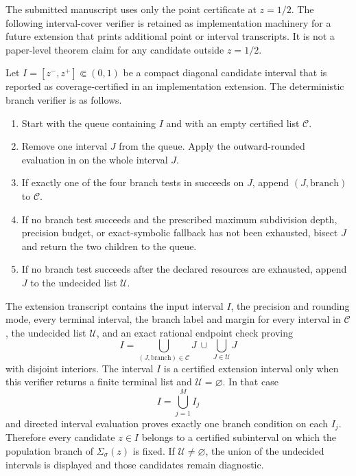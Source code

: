 The submitted manuscript uses only the point certificate at \(z=1/2\).  The
following interval-cover verifier is retained as implementation machinery for a
future extension that prints additional point or interval transcripts.  It is
not a paper-level theorem claim for any candidate outside \(z=1/2\).

\begin{algorithmiclemma}\label{lem:diagonal-certified-interval-cover-main}
Let \(I=[z^-,z^+]\Subset(0,1)\) be a compact diagonal candidate interval that
is reported as coverage-certified in an implementation extension.  The
deterministic branch verifier is as follows.

\begin{enumerate}[label=\textup{(\arabic*)},leftmargin=2.4em,itemsep=0.25em]
\item Start with the queue containing \(I\) and with an empty certified list
\(\mathcal C\).
\item Remove one interval \(J\) from the queue.  Apply the outward-rounded
evaluation in  on the
whole interval \(J\).
\item If exactly one of the four branch tests in
 succeeds on \(J\), append
\((J,\mathrm{branch})\) to \(\mathcal C\).
\item If no branch test succeeds and the prescribed maximum subdivision depth,
precision budget, or exact-symbolic fallback has not been exhausted, bisect
\(J\) and return the two children to the queue.
\item If no branch test succeeds after the declared resources are exhausted,
append \(J\) to the undecided list \(\mathcal U\).
\end{enumerate}

The extension transcript contains the input interval \(I\), the precision and
rounding mode, every terminal interval, the branch label and margin for every
interval in \(\mathcal C\), the undecided list \(\mathcal U\), and an exact
rational endpoint check proving
\[
I=\bigcup_{(J,\mathrm{branch})\in\mathcal C}J\ \cup\
\bigcup_{J\in\mathcal U}J
\]
with disjoint interiors.  The interval \(I\) is a certified extension interval
only when this verifier returns a finite terminal list and
\(\mathcal U=\varnothing\).  In that case
\[
I=\bigcup_{j=1}^M I_j
\]
and directed interval evaluation proves exactly one branch condition on each
\(I_j\).  Therefore every candidate \(z\in I\) belongs to a certified
subinterval on which the population branch of
\(\Sigma_\sigma(z)\) is fixed.  If \(\mathcal U\ne\varnothing\), the union of
the undecided intervals is displayed and those candidates remain diagnostic.
\end{algorithmiclemma}

